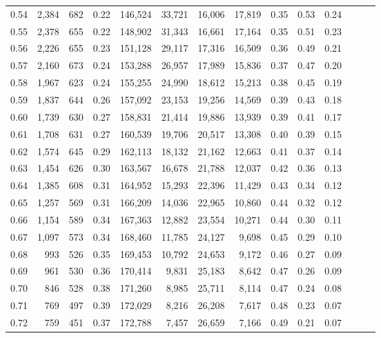 \begin{tabular}{rrrrrrrrrrrrrr}
0.54 &  2,384 &  682 &  0.22 &  146,524 &   33,721 &  16,006 &  17,819 &  0.35 &  0.53 &      0.24 \\
0.55 &  2,378 &  655 &  0.22 &  148,902 &   31,343 &  16,661 &  17,164 &  0.35 &  0.51 &      0.23 \\
0.56 &  2,226 &  655 &  0.23 &  151,128 &   29,117 &  17,316 &  16,509 &  0.36 &  0.49 &      0.21 \\
0.57 &  2,160 &  673 &  0.24 &  153,288 &   26,957 &  17,989 &  15,836 &  0.37 &  0.47 &      0.20 \\
0.58 &  1,967 &  623 &  0.24 &  155,255 &   24,990 &  18,612 &  15,213 &  0.38 &  0.45 &      0.19 \\
0.59 &  1,837 &  644 &  0.26 &  157,092 &   23,153 &  19,256 &  14,569 &  0.39 &  0.43 &      0.18 \\
0.60 &  1,739 &  630 &  0.27 &  158,831 &   21,414 &  19,886 &  13,939 &  0.39 &  0.41 &      0.17 \\
0.61 &  1,708 &  631 &  0.27 &  160,539 &   19,706 &  20,517 &  13,308 &  0.40 &  0.39 &      0.15 \\
0.62 &  1,574 &  645 &  0.29 &  162,113 &   18,132 &  21,162 &  12,663 &  0.41 &  0.37 &      0.14 \\
0.63 &  1,454 &  626 &  0.30 &  163,567 &   16,678 &  21,788 &  12,037 &  0.42 &  0.36 &      0.13 \\
0.64 &  1,385 &  608 &  0.31 &  164,952 &   15,293 &  22,396 &  11,429 &  0.43 &  0.34 &      0.12 \\
0.65 &  1,257 &  569 &  0.31 &  166,209 &   14,036 &  22,965 &  10,860 &  0.44 &  0.32 &      0.12 \\
0.66 &  1,154 &  589 &  0.34 &  167,363 &   12,882 &  23,554 &  10,271 &  0.44 &  0.30 &      0.11 \\
0.67 &  1,097 &  573 &  0.34 &  168,460 &   11,785 &  24,127 &   9,698 &  0.45 &  0.29 &      0.10 \\
0.68 &    993 &  526 &  0.35 &  169,453 &   10,792 &  24,653 &   9,172 &  0.46 &  0.27 &      0.09 \\
0.69 &    961 &  530 &  0.36 &  170,414 &    9,831 &  25,183 &   8,642 &  0.47 &  0.26 &      0.09 \\
0.70 &    846 &  528 &  0.38 &  171,260 &    8,985 &  25,711 &   8,114 &  0.47 &  0.24 &      0.08 \\
0.71 &    769 &  497 &  0.39 &  172,029 &    8,216 &  26,208 &   7,617 &  0.48 &  0.23 &      0.07 \\
0.72 &    759 &  451 &  0.37 &  172,788 &    7,457 &  26,659 &   7,166 &  0.49 &  0.21 &      0.07 \\

\end{tabular}
